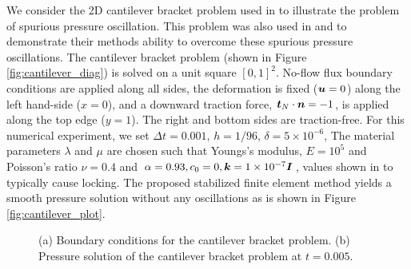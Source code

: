 We consider the 2D cantilever bracket problem used in \cite{phillips2009overcoming} to illustrate the problem of spurious pressure oscillation. This problem was also used in \cite{mear2004discontinuous} and \cite{yi2013coupling} to demonstrate their methods ability to overcome these spurious pressure oscillations. The cantilever bracket problem (shown in Figure \ref{fig:cantilever_diag}) is solved on a unit square $[0,1]^{2}$. No-flow flux boundary conditions are applied along all sides, the deformation is fixed ($\boldsymbol{u}=0$) along the left hand-side (${x}=0$), and a downward traction force, $\boldsymbol{t}_{N}\cdot \boldsymbol{n} =-1$, is applied along the top edge ($y = 1$). The right and bottom sides are traction-free. For this numerical experiment, we set $\Delta t = 0.001$, $h=1/96$, $\delta=5\times 10^{-6}$, The material parameters $\lambda$ and $\mu$ are chosen such that Youngs's modulus, $E=10^{5}$ and Poisson's ratio $ \nu=0.4$ and $\alpha=0.93, c_{0}=0, \boldsymbol{k} =1\times 10^{-7} \boldsymbol{I}$, values shown in  \cite{phillips2009overcoming} to typically cause locking. The proposed stabilized finite element method yields a smooth pressure solution without any oscillations as is shown in Figure \ref{fig:cantilever_plot}.
\begin{figure}[H]
\label{fig:cantilever}
  \centering
\caption{(a) Boundary conditions for the cantilever bracket problem. (b) Pressure solution of the cantilever bracket problem at $t=0.005$.}
\end{figure}

